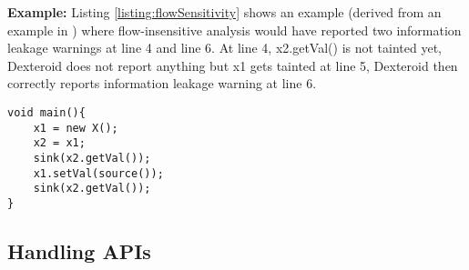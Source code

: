 \documentclass[10pt]{elsarticle}
\begin{document}
{\noindent \bf Example:} Listing \ref{listing:flowSensitivity} shows an example (derived from an example in \cite{FlowDroid}) where flow-insensitive analysis would have reported two information leakage warnings at line 4 and line 6. At line 4, {\ttfamily x2.getVal()} is not tainted yet, Dexteroid does not report anything but {\ttfamily x1} gets tainted at line 5, Dexteroid then correctly reports information leakage warning at line 6.



\begin{comment}
\begin{minipage}{0.94\linewidth}

\end{minipage}
\end{comment}

\noindent\begin{minipage}{7cm}  \begin{lstlisting}
void main(){
	x1 = new X();
	x2 = x1;
	sink(x2.getVal());
	x1.setVal(source());
	sink(x2.getVal());
}
\end{lstlisting}
\end{minipage} 

\subsection {Handling APIs} \label{apiHandlingSection}
\end{document}
